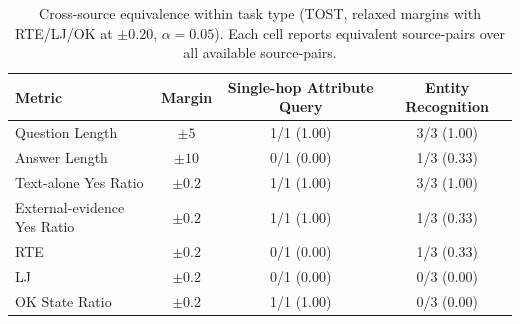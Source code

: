 \begin{table}[htbp]
    \centering
    \caption{Cross-source equivalence within task type (TOST, relaxed margins with RTE/LJ/OK at $\pm 0.20$, $\alpha=0.05$). Each cell reports equivalent source-pairs over all available source-pairs.}
    \setlength{\tabcolsep}{4pt}
    \begin{tabular}{lccc}
    \hline
    Metric & Margin & Single-hop Attribute Query & Entity Recognition \\
    \hline
    Question Length & $\pm5$ & 1/1 (1.00) & 3/3 (1.00) \\
    Answer Length & $\pm10$ & 0/1 (0.00) & 1/3 (0.33) \\
    Text-alone Yes Ratio & $\pm0.2$ & 1/1 (1.00) & 3/3 (1.00) \\
    External-evidence Yes Ratio & $\pm0.2$ & 1/1 (1.00) & 1/3 (0.33) \\
    RTE & $\pm0.2$ & 0/1 (0.00) & 1/3 (0.33) \\
    LJ & $\pm0.2$ & 0/1 (0.00) & 0/3 (0.00) \\
    OK State Ratio & $\pm0.2$ & 1/1 (1.00) & 0/3 (0.00) \\
    \hline
    \end{tabular}
    \label{tab:cross_source_consistency_one_table}
\end{table}
